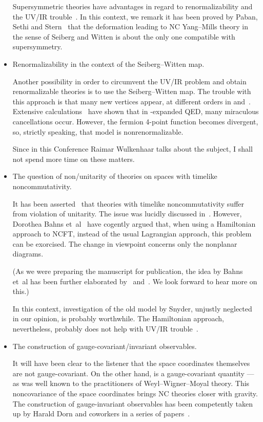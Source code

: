 \documentclass[a4paper,12pt]{article}
\providecommand{\1}{\mathbf{1}}         %
\providecommand{\7}{\dagger}            %
\providecommand{\8}{\bullet}            %
\renewcommand{\.}{\cdot}            %
\renewcommand{\:}{\colon}           %
\begin{document}
\begin{itemize}
Supersymmetric theories have advantages in regard to renormalizability
and the UV/IR trouble~\cite{GirottiGRS}. In this context, we remark it
has been proved by Paban, Sethi and Stern~\cite{PabanSS} that the
deformation leading to NC Yang--Mills theory in the sense of Seiberg
and Witten is about the only one compatible with supersymmetry.


\item  Renormalizability in the context of the Seiberg--Witten map.

Another possibility in order to circumvent the UV/IR problem and
obtain renormalizable theories is to use the Seiberg--Witten map. The
trouble with this approach is that many new vertices appear, at
different orders in \myHighlight{$\theta$}\coordHE{} and~\myHighlight{$\hbar$}\coordHE{}. Extensive
calculations~\cite{WulkenhaarTheta} have shown that in
\myHighlight{$\theta$}\coordHE{}-expanded QED, many miraculous cancellations occur. However,
the fermion 4-point function becomes divergent, so, strictly speaking,
that model is nonrenormalizable.

Since in this Conference Raimar Wulkenhaar talks about the subject, I
shall not spend more time on these matters.


\item  The question of non/unitarity of theories on spaces with
timelike noncommutativity.

It has been asserted~\cite{GomisM} that theories with timelike
noncommutativity suffer from violation of unitarity. The issue was
lucidly discussed in~\cite{LAGBarbonZ}. However, Dorothea Bahns
et~al~\cite{BahnsDFP} have cogently argued that, when using a
Hamiltonian approach to NCFT, instead of the usual Lagrangian
approach, this problem can be exorcised. The change in viewpoint
concerns only the nonplanar diagrams. 

(As we were preparing the manuscript for publication, the idea by
Bahns et~al has been further elaborated by~\cite{RimY}
and~\cite{LiaoS}. We look forward to hear more on this.)

In this context, investigation of the old model by Snyder, unjustly
neglected in our opinion, is probably worthwhile. The Hamiltonian
approach, nevertheless, probably does not help with UV/IR
trouble~\cite{BahnsPrivate}.


\item  The construction of gauge-covariant/invariant observables.

It will have been clear to the listener that the space coordinates 
themselves are not gauge-covariant. On the other hand, 
\coordHE{} is a gauge-covariant quantity
---as was well known to the
practitioners of Weyl--Wigner--Moyal theory. This noncovariance of the
space coordinates brings NC theories closer with gravity. The
construction of gauge-invariant observables has been competently taken
up by Harald Dorn and coworkers in a series of papers~\cite{Dorn}.



\end{itemize}
\end{document}
